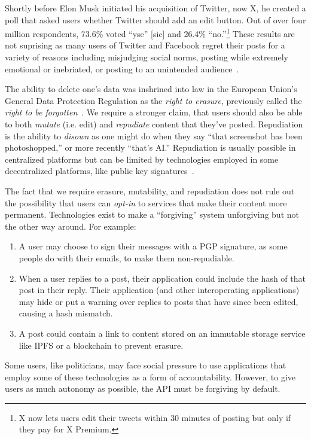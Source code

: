 Shortly before Elon Musk initiated his acquisition of Twitter, now X,
he created a poll that asked users whether Twitter should add an edit button.
Out of over four million respondents, 73.6\% voted ``yse'' [sic] and 26.4\% ``no.''\footnote{
  X now lets users edit their tweets within 30 minutes of posting but only
  if they pay for X Premium.
} These results are not suprising as many users of Twitter and Facebook regret
their posts for a variety of reasons
including misjudging social norms, posting while extremely emotional or inebriated,
or posting to an unintended audience~\cite{regret, regrettwitter}.

The ability to delete one's data was inshrined into law in the European Union's
General Data Protection Regulation as
the \emph{right to erasure}, previously called the \emph{right to be forgotten}~\cite{gdpr}.
We require a stronger claim, that users should also be able to both \emph{mutate} (i.e. edit)
and \emph{repudiate} content that they've posted. Repudiation is the ability to \emph{disown}
as one might do when they say ``that screenshot has been photoshopped,''
or more recently ``that's AI.'' Repudiation is usually possible in centralized platforms
but can be limited by technologies employed in some decentralized platforms,
like public key signatures~\cite{offtherecord}.

The fact that we require erasure, mutability, and repudiation does not rule
out the possibility that users can \emph{opt-in} to services that make their content more permanent.
Technologies exist to make a ``forgiving'' system unforgiving but not the other way around.
For example:
\begin{enumerate}
\item
A user may choose to sign their messages with a PGP signature,
as some people do with their emails, to make them non-repudiable.
\item
When a user replies to a post, their application could include the hash
of that post in their reply. Their application (and other interoperating applications)
may hide or put a warning over replies to posts that have since been edited,
causing a hash mismatch.
\item
A post could contain a link to content stored on an immutable storage service like IPFS
or a blockchain to prevent erasure.
\end{enumerate}
Some users, like politicians, may face social pressure to use applications
that employ some of these technologies as a form of accountability.
However, to give users as much autonomy as possible, the API must be forgiving by default.
